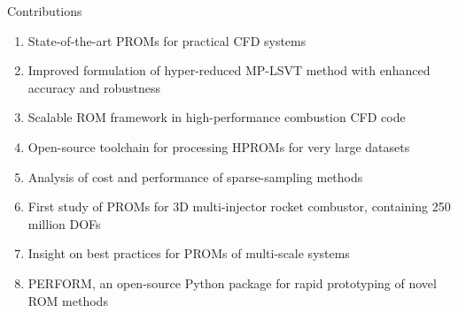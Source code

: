 \documentclass[]{beamer}
\begin{document}

\begin{frame}{Contributions}
    \begin{enumerate}
        \item State-of-the-art PROMs for practical CFD systems
        \item Improved formulation of hyper-reduced MP-LSVT method with enhanced accuracy and robustness
        \item Scalable ROM framework in high-performance combustion CFD code
        \item Open-source toolchain for processing HPROMs for very large datasets
        \item Analysis of cost and performance of sparse-sampling methods
        \item First study of PROMs for 3D multi-injector rocket combustor, containing 250 million DOFs
        \item Insight on best practices for PROMs of multi-scale systems
        \item PERFORM, an open-source Python package for rapid prototyping of novel ROM methods
    \end{enumerate}
\end{frame}
\end{document}
